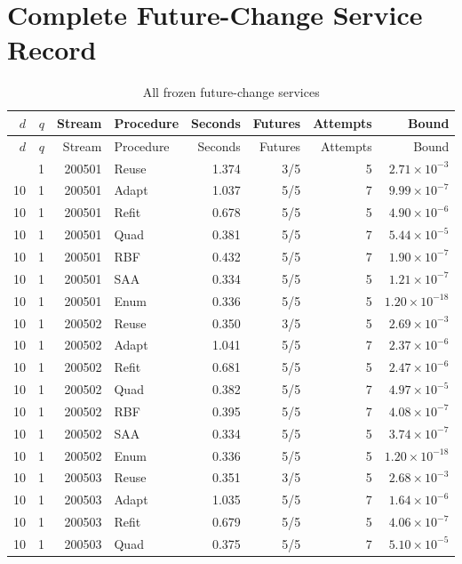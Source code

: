\section{Complete Future-Change Service Record}\label{app:r21record}
\small
\begin{longtable}{rrrlrrrr}
\caption{All frozen future-change services}\label{tab:r21all}\\
\toprule $d$ & $q$ & Stream & Procedure & Seconds & Futures & Attempts & Bound\\\midrule\endfirsthead
\toprule $d$ & $q$ & Stream & Procedure & Seconds & Futures & Attempts & Bound\\\midrule\endhead
\bottomrule\endfoot
10 & 1 & 200501 & Reuse & 1.374 & 3/5 & 5 & $2.71\times10^{-3}$\\
10 & 1 & 200501 & Adapt & 1.037 & 5/5 & 7 & $9.99\times10^{-7}$\\
10 & 1 & 200501 & Refit & 0.678 & 5/5 & 5 & $4.90\times10^{-6}$\\
10 & 1 & 200501 & Quad & 0.381 & 5/5 & 7 & $5.44\times10^{-5}$\\
10 & 1 & 200501 & RBF & 0.432 & 5/5 & 7 & $1.90\times10^{-7}$\\
10 & 1 & 200501 & SAA & 0.334 & 5/5 & 5 & $1.21\times10^{-7}$\\
10 & 1 & 200501 & Enum & 0.336 & 5/5 & 5 & $1.20\times10^{-18}$\\
10 & 1 & 200502 & Reuse & 0.350 & 3/5 & 5 & $2.69\times10^{-3}$\\
10 & 1 & 200502 & Adapt & 1.041 & 5/5 & 7 & $2.37\times10^{-6}$\\
10 & 1 & 200502 & Refit & 0.681 & 5/5 & 5 & $2.47\times10^{-6}$\\
10 & 1 & 200502 & Quad & 0.382 & 5/5 & 7 & $4.97\times10^{-5}$\\
10 & 1 & 200502 & RBF & 0.395 & 5/5 & 7 & $4.08\times10^{-7}$\\
10 & 1 & 200502 & SAA & 0.334 & 5/5 & 5 & $3.74\times10^{-7}$\\
10 & 1 & 200502 & Enum & 0.336 & 5/5 & 5 & $1.20\times10^{-18}$\\
10 & 1 & 200503 & Reuse & 0.351 & 3/5 & 5 & $2.68\times10^{-3}$\\
10 & 1 & 200503 & Adapt & 1.035 & 5/5 & 7 & $1.64\times10^{-6}$\\
10 & 1 & 200503 & Refit & 0.679 & 5/5 & 5 & $4.06\times10^{-7}$\\
10 & 1 & 200503 & Quad & 0.375 & 5/5 & 7 & $5.10\times10^{-5}$\\

\end{longtable}

